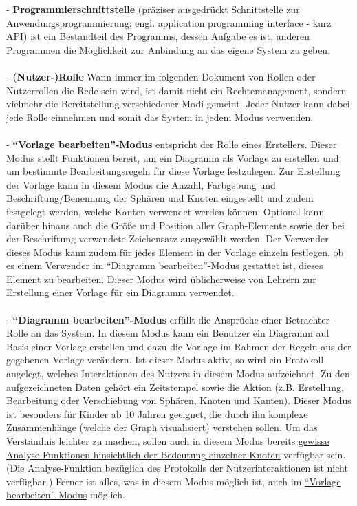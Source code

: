 \documentclass[enabledeprecatedfontcommands,fontsize=11pt,paper=a4,twoside]{scrartcl}
\newcounter{one}
\begin{document}
- \textbf{Programmierschnittstelle} (präziser ausgedrückt Schnittstelle zur Anwendungsprogrammierung; engl. application programming interface - kurz API) ist ein Bestandteil des Programms, dessen Aufgabe es ist, anderen Programmen die Möglichkeit zur Anbindung an das eigene System zu geben.\\ \\
- \textbf{(Nutzer-)Rolle} Wann immer im folgenden Dokument von Rollen oder Nutzerrollen die Rede sein wird, ist damit nicht ein Rechtemanagement, sondern vielmehr die Bereitstellung verschiedener Modi gemeint. Jeder Nutzer kann dabei jede Rolle einnehmen und somit das System in jedem Modus verwenden. \\ \\
- \textbf{\hypertarget{``Vorlage bearbeiten''-Modus}{``Vorlage bearbeiten''-Modus}} entspricht der Rolle eines Erstellers. Dieser Modus stellt Funktionen bereit, um ein Diagramm als Vorlage zu erstellen und um bestimmte Bearbeitungsregeln für diese Vorlage festzulegen. Zur Erstellung der Vorlage kann in diesem Modus die Anzahl, Farbgebung und Beschriftung/Benennung der Sphären und Knoten eingestellt und zudem festgelegt werden, welche Kanten verwendet werden können. Optional kann darüber hinaus auch die Größe und Position aller Graph-Elemente sowie der bei der Beschriftung verwendete Zeichensatz ausgewählt werden. Der Verwender dieses Modus kann zudem für jedes Element in der Vorlage einzeln festlegen, ob es einem Verwender im ``Diagramm bearbeiten''-Modus gestattet ist, dieses Element zu bearbeiten. Dieser Modus wird üblicherweise von Lehrern zur Erstellung einer Vorlage für ein Diagramm verwendet. \\ \\
- \textbf{\hypertarget{``Diagramm bearbeiten''-Modus}{``Diagramm bearbeiten''-Modus}} erfüllt die Ansprüche einer Betrachter-Rolle an das System. In diesem Modus kann ein Benutzer ein Diagramm auf Basis einer Vorlage erstellen und dazu die Vorlage im Rahmen der Regeln aus der gegebenen Vorlage verändern. Ist dieser Modus aktiv, so wird ein Protokoll angelegt, welches Interaktionen des Nutzers in diesem Modus aufzeichnet. Zu den aufgezeichneten Daten gehört ein Zeitstempel sowie die Aktion (z.B. Erstellung, Bearbeitung oder Verschiebung von Sphären, Knoten und Kanten). Dieser Modus ist besonders für Kinder ab 10 Jahren geeignet, die durch ihn komplexe Zusammenhänge (welche der Graph visualisiert) verstehen sollen. Um das Verständnis leichter zu machen, sollen auch in diesem Modus bereits \hyperlink{Bedeutung eines Knoten}{gewisse Analyse-Funktionen hinsichtlich der Bedeutung einzelner Knoten} verfügbar sein. (Die Analyse-Funktion bezüglich des Protokolls der Nutzerinteraktionen ist nicht verfügbar.) Ferner ist alles, was in diesem Modus möglich ist, auch im \hyperlink{``Vorlage bearbeiten''-Modus}{``Vorlage bearbeiten''-Modus} möglich.\\ \\
\end{document}
